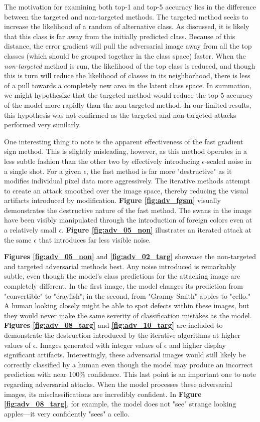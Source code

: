 \documentclass[]{article}
\begin{document}
The motivation for examining both top-1 and top-5 accuracy lies in the difference between the targeted and non-targeted methods. The targeted method seeks to increase the likelihood of a random of alternative class. As discussed, it is likely that this class is far away from the initially predicted class. Because of this distance, the error gradient will pull the adversarial image away from all the top classes (which should be grouped together in the class space) faster. When the \textit{non-targeted} method is run, the likelihood of the top class is reduced, and though this is turn will reduce the likelihood of classes in its neighborhood, there is less of a pull towards a completely new area in the latent class space. In summation, we might hypothesize that the targeted method would reduce the top-5 accuracy of the model more rapidly than the non-targeted method. In our limited results, this hypothesis was not confirmed as the targeted and non-targeted attacks performed very similarly.

One interesting thing to note is the apparent effectiveness of the fast gradient sign method. This is slightly misleading, however, as this method operates in a less subtle fashion than the other two by effectively introducing $\epsilon$-scaled noise in a single shot. For a given $\epsilon$, the fast method is far more "destructive" as it modifies individual pixel data more aggressively. The iterative methods attempt to create an attack smoothed over the image space, thereby reducing the visual artifacts introduced by modification. \textbf{Figure \ref{fig:adv_fgsm}} visually demonstrates the destructive nature of the fast method. The swans in the image have been visibly manipulated through the introduction of foreign colors even at a relatively small $\epsilon$. \textbf{Figure \ref{fig:adv_05_non}} illustrates an iterated attack at the same $\epsilon$ that introduces far less visible noise.

\textbf{Figures \ref{fig:adv_05_non}} and \textbf{\ref{fig:adv_02_targ}} showcase the non-targeted and targeted adversarial methods best. Any noise introduced is remarkably subtle, even though the model's class predictions for the attacking image are completely different. In the first image, the model changes its prediction from "convertible" to "crayfish"; in the second, from "Granny Smith" apples to "cello." A human looking closely might be able to spot defects within these images, but they would never make the same severity of classification mistakes as the model. \textbf{Figures \ref{fig:adv_08_targ}} and \textbf{\ref{fig:adv_10_targ}} are included to demonstrate the destruction introduced by the iterative algorithms at higher values of $\epsilon$. Images generated with integer values of $\epsilon$ and higher display significant artifacts. Interestingly, these adversarial images would still likely be correctly classified by a human even though the model may produce an incorrect prediction with near 100\% confidence. This last point is an important one to note regarding adversarial attacks. When the model processes these adversarial images, its misclassifications are incredibly confident. In  \textbf{Figure \ref{fig:adv_08_targ}}, for example, the model does not "see" strange looking apples---it very confidently "sees" a cello.
\end{document}
